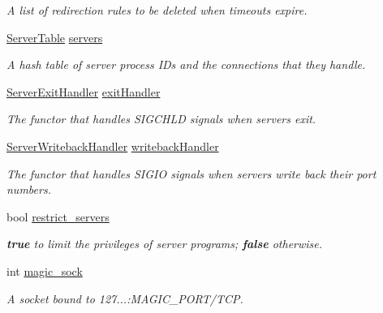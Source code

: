 \begin{DoxyCompactItemize}
\begin{DoxyCompactList}\small\item\em \-A list of redirection rules to be deleted when timeouts expire. \end{DoxyCompactList}\item 
\hyperlink{classNERD_1_1ConnectionServer_a0cd661f2a6755c501ac198229675ad4d}{\-Server\-Table} \hyperlink{classNERD_1_1ConnectionServer_a990a4882c5123f35208d36cabb5fef67}{servers}
\begin{DoxyCompactList}\small\item\em \-A hash table of server process \-I\-Ds and the connections that they handle. \end{DoxyCompactList}\item 
\hyperlink{classNERD_1_1ConnectionServer_1_1ServerExitHandler}{\-Server\-Exit\-Handler} \hyperlink{classNERD_1_1ConnectionServer_a87fc9625f6d518ffe294e4f759d3cae0}{exit\-Handler}
\begin{DoxyCompactList}\small\item\em \-The functor that handles \-S\-I\-G\-C\-H\-L\-D signals when servers exit. \end{DoxyCompactList}\item 
\hyperlink{classNERD_1_1ConnectionServer_1_1ServerWritebackHandler}{\-Server\-Writeback\-Handler} \hyperlink{classNERD_1_1ConnectionServer_a8aa938754f8f34144d205d4dd208d91a}{writeback\-Handler}
\begin{DoxyCompactList}\small\item\em \-The functor that handles \-S\-I\-G\-I\-O signals when servers write back their port numbers. \end{DoxyCompactList}\item 
bool \hyperlink{classNERD_1_1ConnectionServer_ae54611cb80881c2a73d69e145df4bbd7}{restrict\-\_\-servers}
\begin{DoxyCompactList}\small\item\em {\bfseries true} to limit the privileges of server programs; {\bfseries false} otherwise. \end{DoxyCompactList}\item 
int \hyperlink{classNERD_1_1ConnectionServer_a3168fab5ca817d2cd2cb7ca15228440d}{magic\-\_\-sock}
\begin{DoxyCompactList}\small\item\em \-A socket bound to 127...\-:\-M\-A\-G\-I\-C\-\_\-\-P\-O\-R\-T/\-T\-C\-P. \end{DoxyCompactList}\end{DoxyCompactItemize}


